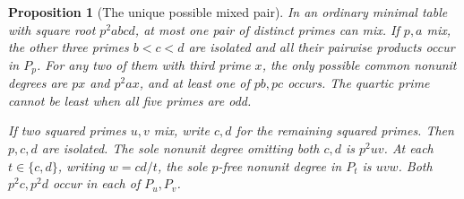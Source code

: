 \documentclass[11pt,a4paper]{article}
\numberwithin{equation}{section}
\newtheorem{proposition}[theorem]{Proposition}
\theoremstyle{remark}
\begin{document}
\begin{proposition}[The unique possible mixed pair]\label{fam:F:5.3}\label{fam:F:5.4}\label{fam:F:5.5}
In an ordinary minimal table with square root $p^2abcd$, at most one
pair of distinct primes can mix.
If $p,a$ mix, the other three primes $b<c<d$ are isolated and all
their pairwise products occur in $P_p$. For any two of them with third
prime $x$, the only possible common nonunit degrees are $px$ and
$p^2ax$, and at least one of $pb,pc$ occurs. The quartic prime cannot
be least when all five primes are odd.

If two squared primes $u,v$ mix, write $c,d$ for the remaining squared
primes. Then $p,c,d$ are isolated. The sole nonunit degree omitting
both $c,d$ is $p^2uv$. At each $t\in\{c,d\}$, writing $w=cd/t$,
the sole $p$-free nonunit degree in $P_t$ is $uvw$. Both $p^2c,p^2d$
occur in each of $P_u,P_v$.
\end{proposition}
\end{document}
